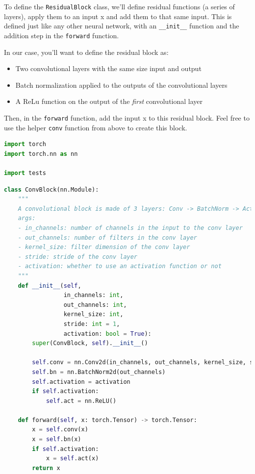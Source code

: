 To define the \lstinline{ResidualBlock} class, we'll
define residual functions (a series of layers), apply them to an input x
and add them to that same input. This is defined just like any other
neural network, with an \lstinline{__init__} function
and the addition step in the \lstinline{forward} function. \newline

In our case, you'll want to define the residual block as: 
\begin{itemize}
    \item Two convolutional layers with the same size input and output
    \item Batch normalization applied to the outputs of the convolutional layers
    \item A ReLu function on the output of the \emph{first} convolutional layer
\end{itemize}

Then, in the \lstinline{forward} function, add the input x
to this residual block. Feel free to use the helper
\lstinline{conv} function from above to create this block.

\begin{lstlisting}[language=Python]
import torch
import torch.nn as nn

import tests
\end{lstlisting}

\begin{lstlisting}[language=Python]
class ConvBlock(nn.Module):
    """
    A convolutional block is made of 3 layers: Conv -> BatchNorm -> Activation.
    args:
    - in_channels: number of channels in the input to the conv layer
    - out_channels: number of filters in the conv layer
    - kernel_size: filter dimension of the conv layer
    - stride: stride of the conv layer
    - activation: whether to use an activation function or not
    """
    def __init__(self, 
                 in_channels: int, 
                 out_channels: int, 
                 kernel_size: int,
                 stride: int = 1,
                 activation: bool = True):
        super(ConvBlock, self).__init__()
        
        self.conv = nn.Conv2d(in_channels, out_channels, kernel_size, stride=stride, padding=1, bias=False)
        self.bn = nn.BatchNorm2d(out_channels)
        self.activation = activation
        if self.activation:
            self.act = nn.ReLU()
        
    def forward(self, x: torch.Tensor) -> torch.Tensor:
        x = self.conv(x)
        x = self.bn(x)
        if self.activation:
            x = self.act(x)
        return x
\end{lstlisting}

